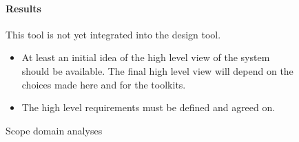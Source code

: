 \begin{figure}[!h]
{\begin{boxedminipage}[b]{.32\textwidth}
{	    \paragraph{Results} This tool is not yet integrated into the design tool.
	}%
    \end{boxedminipage}
    }%

    \begin{boxedminipage}[c]{.8\textwidth}
    \begin{itemize}
	\item At least an initial idea of the high level view of the system should be available. The final high level
		view will depend on the choices made here and for the toolkits.
	\item The high level requirements must be defined and agreed on.
    \end{itemize}
    \end{boxedminipage}


    \caption{Scope domain analyses}
    \label{fig: domain-analysis}
\end{figure}
